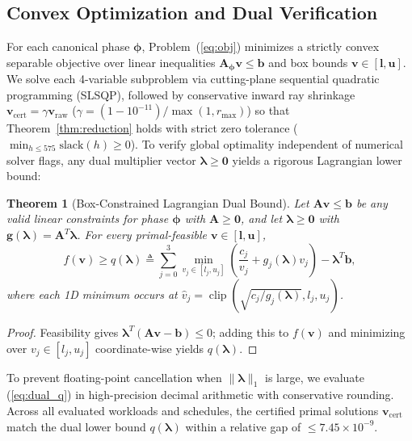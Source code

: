 \documentclass[sigconf, nonacm]{acmart}
\newtheorem{theorem}{Theorem}
\begin{document}
\subsection{Convex Optimization and Dual Verification}
For each canonical phase $\boldsymbol{\phi}$, Problem~(\ref{eq:obj}) minimizes a strictly convex separable objective over linear inequalities $\mathbf{A}_{\boldsymbol{\phi}}\mathbf{v} \le \mathbf{b}$ and box bounds $\mathbf{v} \in [\mathbf{l}, \mathbf{u}]$. We solve each 4-variable subproblem via cutting-plane sequential quadratic programming (SLSQP), followed by conservative inward ray shrinkage $\mathbf{v}_{\mathrm{cert}} = \gamma \mathbf{v}_{\mathrm{raw}}$ ($\gamma = (1 - 10^{-11})/\max(1, r_{\max})$) so that Theorem~\ref{thm:reduction} holds with strict zero tolerance ($\min_{h \le 575}\mathrm{slack}(h) \ge 0$). To verify global optimality independent of numerical solver flags, any dual multiplier vector $\boldsymbol{\lambda} \ge \mathbf{0}$ yields a rigorous Lagrangian lower bound:

\begin{theorem}[Box-Constrained Lagrangian Dual Bound]
\label{thm:dual}
Let $\mathbf{A}\mathbf{v} \le \mathbf{b}$ be any valid linear constraints for phase $\boldsymbol{\phi}$ with $\mathbf{A} \ge \mathbf{0}$, and let $\boldsymbol{\lambda} \ge \mathbf{0}$ with $\mathbf{g}(\boldsymbol{\lambda}) = \mathbf{A}^T \boldsymbol{\lambda}$. For every primal-feasible $\mathbf{v} \in [\mathbf{l}, \mathbf{u}]$,
\begin{equation}
\label{eq:dual_q}
f(\mathbf{v}) \ge q(\boldsymbol{\lambda}) \triangleq \sum_{j=0}^3 \min_{v_j \in [l_j, u_j]}\left(\frac{c_j}{v_j} + g_j(\boldsymbol{\lambda}) v_j\right) - \boldsymbol{\lambda}^T \mathbf{b},
\end{equation}
where each 1D minimum occurs at $\hat{v}_j = \operatorname{clip}(\sqrt{c_j/g_j(\boldsymbol{\lambda})}, l_j, u_j)$.
\end{theorem}
\begin{proof}
Feasibility gives $\boldsymbol{\lambda}^T(\mathbf{A}\mathbf{v} - \mathbf{b}) \le 0$; adding this to $f(\mathbf{v})$ and minimizing over $v_j \in [l_j, u_j]$ coordinate-wise yields $q(\boldsymbol{\lambda})$.
\end{proof}

To prevent floating-point cancellation when $\|\boldsymbol{\lambda}\|_1$ is large, we evaluate (\ref{eq:dual_q}) in high-precision decimal arithmetic with conservative rounding. Across all evaluated workloads and schedules, the certified primal solutions $\mathbf{v}_{\mathrm{cert}}$ match the dual lower bound $q(\boldsymbol{\lambda})$ within a relative gap of $\le 7.45 \times 10^{-9}$.
\end{document}
